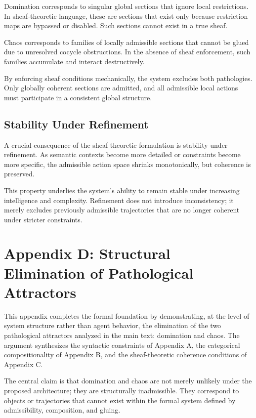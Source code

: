 \documentclass[11pt,oneside]{article}
\begin{document}
Domination corresponds to singular global sections that ignore local restrictions. In sheaf-theoretic language, these are sections that exist only because restriction maps are bypassed or disabled. Such sections cannot exist in a true sheaf.

Chaos corresponds to families of locally admissible sections that cannot be glued due to unresolved cocycle obstructions. In the absence of sheaf enforcement, such families accumulate and interact destructively.

By enforcing sheaf conditions mechanically, the system excludes both pathologies. Only globally coherent sections are admitted, and all admissible local actions must participate in a consistent global structure.

\subsection{Stability Under Refinement}

A crucial consequence of the sheaf-theoretic formulation is stability under refinement. As semantic contexts become more detailed or constraints become more specific, the admissible action space shrinks monotonically, but coherence is preserved.

This property underlies the system’s ability to remain stable under increasing intelligence and complexity. Refinement does not introduce inconsistency; it merely excludes previously admissible trajectories that are no longer coherent under stricter constraints.

\section{Appendix D: Structural Elimination of Pathological Attractors}

This appendix completes the formal foundation by demonstrating, at the level of system structure rather than agent behavior, the elimination of the two pathological attractors analyzed in the main text: domination and chaos. The argument synthesizes the syntactic constraints of Appendix A, the categorical compositionality of Appendix B, and the sheaf-theoretic coherence conditions of Appendix C.

The central claim is that domination and chaos are not merely unlikely under the proposed architecture; they are structurally inadmissible. They correspond to objects or trajectories that cannot exist within the formal system defined by admissibility, composition, and gluing.
\end{document}
